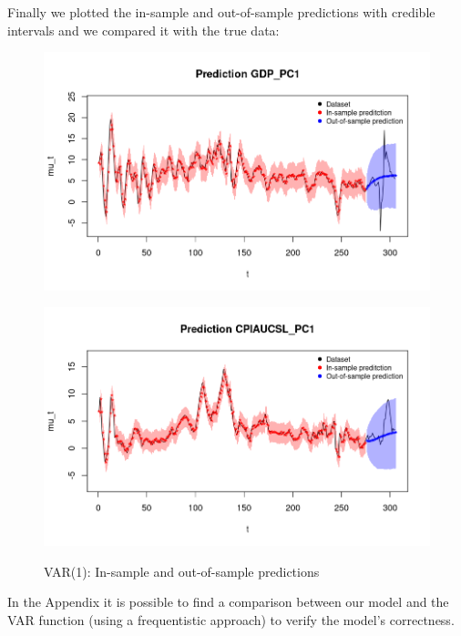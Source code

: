 Finally we plotted the in-sample and out-of-sample predictions with credible intervals and we compared it with the true data: \\   
\begin{figure}[h]
    \centering
    \begin{minipage}[t]{0.7\textwidth}
        \centering
        \includegraphics[width=\textwidth]{images/6-VAR/gdp_prediction.png}
        \label{fig:VAR_first}
    \end{minipage}
    \begin{minipage}[t]{0.7\textwidth}
        \centering
        \includegraphics[width=\textwidth]{images/6-VAR/infl_prediction.png}
        \label{fig:VAR_second}
    \end{minipage}
    \caption{VAR(1): In-sample and out-of-sample predictions}
    \label{fig:VAR_combined}
\end{figure}
In the Appendix it is possible to find a comparison between our model and the VAR function (using a frequentistic approach) to verify the model's correctness.